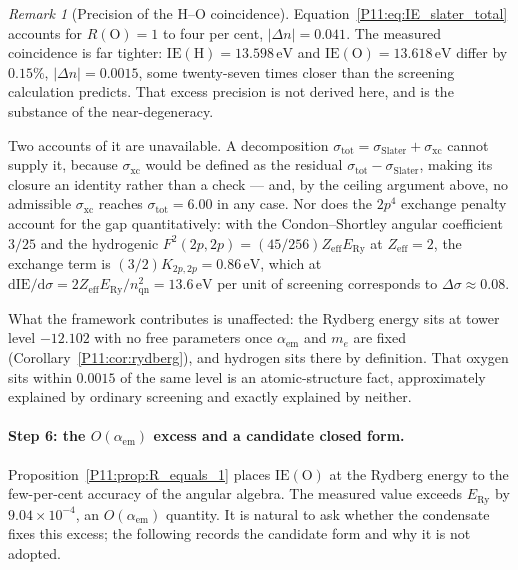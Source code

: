 \documentclass[11pt,a4paper]{article}
\theoremstyle{definition}
\theoremstyle{remark}
\newtheorem{remark}[theorem]{Remark}
\newcommand{\ERy}{E_{\mathrm{Ry}}}
\newcommand{\aem}{\alpha_{\mathrm{em}}}
\newcommand{\IE}{\mathrm{IE}}
\begin{document}
\begin{remark}[Precision of the H--O coincidence]
\label{P11:rem:sigma_xc_origin}
Equation~\eqref{P11:eq:IE_slater_total} accounts for
$R(\mathrm{O})=1$ to four per cent, $|\Delta n| = 0.041$.  The measured
coincidence is far tighter: $\IE(\mathrm{H})=13.598\,\mathrm{eV}$ and
$\IE(\mathrm{O})=13.618\,\mathrm{eV}$ differ by $0.15\%$,
$|\Delta n| = 0.0015$, some twenty-seven times closer than the
screening calculation predicts.  That excess precision is not derived
here, and is the substance of the near-degeneracy.

Two accounts of it are unavailable.  A decomposition
$\sigma_\mathrm{tot} = \sigma_\mathrm{Slater} + \sigma_\mathrm{xc}$
cannot supply it, because $\sigma_\mathrm{xc}$ would be defined as the
residual $\sigma_\mathrm{tot}-\sigma_\mathrm{Slater}$, making its
closure an identity rather than a check --- and, by the ceiling
argument above, no admissible $\sigma_\mathrm{xc}$ reaches
$\sigma_\mathrm{tot}=6.00$ in any case.  Nor does the $2p^4$ exchange
penalty account for the gap quantitatively: with the Condon--Shortley
angular coefficient $3/25$ and the hydrogenic
$F^2(2p,2p)=(45/256)Z_\mathrm{eff}\ERy$ at $Z_\mathrm{eff}=2$, the
exchange term is $(3/2)K_{2p,2p} = 0.86\,\mathrm{eV}$, which at
$\mathrm{d}\IE/\mathrm{d}\sigma = 2Z_\mathrm{eff}\ERy/n_\mathrm{qn}^2
= 13.6\,\mathrm{eV}$ per unit of screening corresponds to
$\Delta\sigma \approx 0.08$.

What the framework contributes is unaffected: the Rydberg energy sits
at tower level $-12.102$ with no free parameters once $\aem$ and $m_e$
are fixed (Corollary~\ref{P11:cor:rydberg}), and hydrogen sits there by
definition.  That oxygen sits within $0.0015$ of the same level is an
atomic-structure fact, approximately explained by ordinary screening
and exactly explained by neither.
\end{remark}

\paragraph{Step 6: the $O(\aem)$ excess and a candidate closed form.}

Proposition~\ref{P11:prop:R_equals_1} places $\IE(\mathrm{O})$ at the
Rydberg energy to the few-per-cent accuracy of the angular algebra.
The measured value exceeds $\ERy$ by $9.04\times10^{-4}$, an $O(\aem)$
quantity.  It is natural to ask whether the condensate fixes this
excess; the following records the candidate form and why it is not
adopted.
\end{document}
